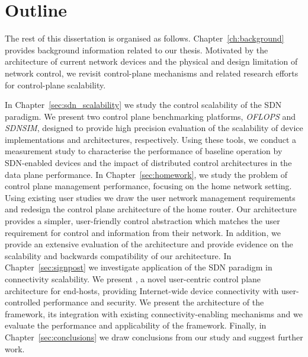 \section{Outline} \label{sec:intro:outline}

The rest of this dissertation is organised as follows.
Chapter~\ref{ch:background} provides background information related to our
thesis. Motivated by the architecture of current network devices and the
physical and design limitation of network control, we revisit control-plane
mechanisms and related research efforts for control-plane scalability.  

In Chapter~\ref{sec:sdn_scalability} we study the control scalability of the SDN
paradigm.  We present two control plane benchmarking platforms, {\it OFLOPS}
\/and {\it SDNSIM}, designed to provide high precision evaluation of the
scalability of \of device implementations and architectures, respectively. Using
these tools, we conduct a measurement study to characterise the performance of
baseline \of operation by SDN-enabled devices and the impact of
distributed control architectures in the data plane performance.  In
Chapter~\ref{sec:homework}, we study the problem of control plane management
performance, focusing on the home network setting. Using existing user studies
we draw the user network management requirements and redesign the control plane
architecture of the home router. Our architecture provides a simpler,
user-friendly control abstraction which matches the user requirement for control
and information from their network. In addition, we provide an extensive
evaluation of the architecture and provide evidence on the scalability and
backwards compatibility of our architecture.  In Chapter~\ref{sec:signpost} we
investigate application of the SDN paradigm in connectivity scalability. We
present \signpost, a novel user-centric control plane architecture for
end-hosts, providing Internet-wide device connectivity with user-controlled
performance and security. We present the architecture of the framework, its
integration with existing connectivity-enabling mechanisms and we evaluate the
performance and applicability of the framework.  Finally, in
Chapter~\ref{sec:conclusions} we draw conclusions from our study and suggest
further work. 



